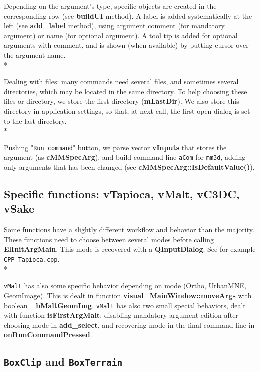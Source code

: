 Depending on the argument's type, specific objects are created in the corresponding row (see \textbf{buildUI} method). A label is added systematically at the left (see \textbf{add\_label} method), using argument comment (for mandatory argument) or name (for optional argument). A tool tip is added for optional arguments with comment, and is shown (when available) by putting cursor over the argument name.\\*

Dealing with files: many commands need several files, and sometimes several directories, which may be located in the same directory. To help choosing these files or directory, we store the first directory (\textbf{mLastDir}). We also store this directory in application settings, so that, at next call, the first open dialog is set to the last directory.\\*

Pushing "{\tt Run command}" button, we parse vector \textbf{vInputs} that stores the argument (as \textbf{ cMMSpecArg}), and build command line {\tt aCom} for {\tt mm3d}, adding only arguments that has been changed (see \textbf{cMMSpecArg::IsDefaultValue()}).

\subsection{Specific functions: vTapioca, vMalt, vC3DC, vSake}

Some functions have a slightly different workflow and behavior than the majority. These functions need to choose between several modes before calling \textbf{ElInitArgMain}. This mode is recovered with a \textbf{ QInputDialog}. See for example {\tt CPP\_Tapioca.cpp}.\\*

{\tt vMalt} has also some specific behavior depending on mode (Ortho, UrbanMNE, GeomImage). This is dealt in function \textbf{visual\_MainWindow::moveArgs} with boolean \textbf{\_bMaltGeomImg}. {\tt vMalt} has also two small special behaviors, dealt with function \textbf{isFirstArgMalt}: disabling mandatory argument edition after choosing mode in \textbf{add\_select}, and recovering mode in the final command line in \textbf{onRunCommandPressed}.

\subsection{ {\tt BoxClip} and  {\tt BoxTerrain} }

